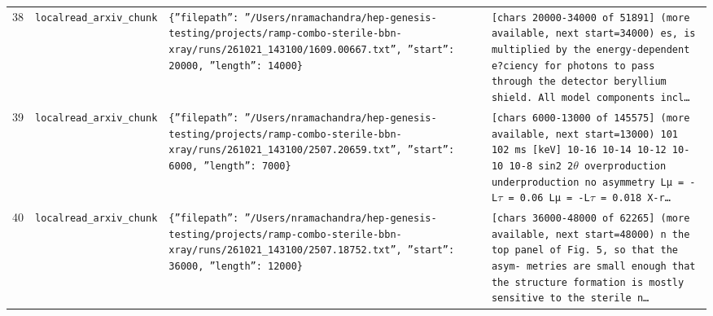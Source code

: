 \documentclass[11pt,a4paper]{article}
\begin{document}
\begin{longtable}{@{}p{}p{}p{}p{}@{}}
38 & \texttt{local}\newline\texttt{read\_\allowbreak{}arxiv\_\allowbreak{}chunk} & \texttt{\{''filepath'':\allowbreak{} ''/\allowbreak{}Users/\allowbreak{}nramachandra/\allowbreak{}hep-genesis-testing/\allowbreak{}projects/\allowbreak{}ramp-combo-sterile-bbn-xray/\allowbreak{}runs/\allowbreak{}261021\_\allowbreak{}143100/\allowbreak{}1609.00667.txt'',\allowbreak{} ''start'':\allowbreak{} 20000,\allowbreak{} ''length'':\allowbreak{} 14000\}\allowbreak{}} & \texttt{[chars 20000-34000 of 51891]\allowbreak{} (more available,\allowbreak{} next start=\allowbreak{}34000)\allowbreak{}  es,\allowbreak{} is multiplied by the energy-dependent e?ciency for photons to pass through the detector beryllium shield. All model components incl\ldots{}\allowbreak{}} \\
39 & \texttt{local}\newline\texttt{read\_\allowbreak{}arxiv\_\allowbreak{}chunk} & \texttt{\{''filepath'':\allowbreak{} ''/\allowbreak{}Users/\allowbreak{}nramachandra/\allowbreak{}hep-genesis-testing/\allowbreak{}projects/\allowbreak{}ramp-combo-sterile-bbn-xray/\allowbreak{}runs/\allowbreak{}261021\_\allowbreak{}143100/\allowbreak{}2507.20659.txt'',\allowbreak{} ''start'':\allowbreak{} 6000,\allowbreak{} ''length'':\allowbreak{} 7000\}\allowbreak{}} & \texttt{[chars 6000-13000 of 145575]\allowbreak{} (more available,\allowbreak{} next start=\allowbreak{}13000)\allowbreak{}   101 102 ms [keV]\allowbreak{} 10-16 10-14 10-12 10-10 10-8 sin2 2$\theta$ overproduction underproduction no asymmetry Lµ =\allowbreak{} -L$\tau$ =\allowbreak{} 0.06 Lµ =\allowbreak{} -L$\tau$ =\allowbreak{} 0.018 X-r\ldots{}\allowbreak{}} \\
40 & \texttt{local}\newline\texttt{read\_\allowbreak{}arxiv\_\allowbreak{}chunk} & \texttt{\{''filepath'':\allowbreak{} ''/\allowbreak{}Users/\allowbreak{}nramachandra/\allowbreak{}hep-genesis-testing/\allowbreak{}projects/\allowbreak{}ramp-combo-sterile-bbn-xray/\allowbreak{}runs/\allowbreak{}261021\_\allowbreak{}143100/\allowbreak{}2507.18752.txt'',\allowbreak{} ''start'':\allowbreak{} 36000,\allowbreak{} ''length'':\allowbreak{} 12000\}\allowbreak{}} & \texttt{[chars 36000-48000 of 62265]\allowbreak{} (more available,\allowbreak{} next start=\allowbreak{}48000)\allowbreak{}  n the top panel of Fig. 5,\allowbreak{} so that the asym- metries are small enough that the structure formation is mostly sensitive to the sterile n\ldots{}\allowbreak{}} \\

\end{longtable}
\end{document}
